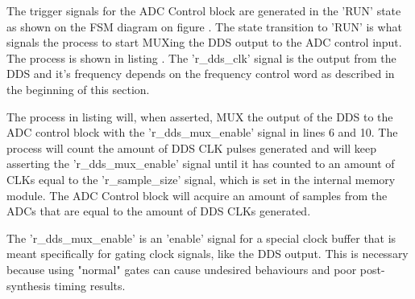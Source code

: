 The trigger signals for the ADC Control block are generated in the 'RUN' state as shown on the FSM diagram on figure . The state transition to 'RUN' is what signals the process to start MUXing the DDS output to the ADC control input. The process is shown in listing . The 'r\_dds\_clk' signal is the output from the DDS and it's frequency depends on the frequency control word as described in the beginning of this section.



The process in listing  will, when asserted, MUX the output of the DDS to the ADC control block with the 'r\_dds\_mux\_enable' signal in lines 6 and 10. The process will count the amount of DDS CLK pulses generated and will keep asserting the 'r\_dds\_mux\_enable' signal until it has counted to an amount of CLKs equal to the 'r\_sample\_size' signal, which is set in the internal memory module. The ADC Control block will acquire an amount of samples from the ADCs that are equal to the amount of DDS CLKs generated.

The 'r\_dds\_mux\_enable' is an 'enable' signal for a special clock buffer \cite{BUGGCEClockBuffer} that is meant specifically for gating clock signals, like the DDS output. This is necessary because using "normal" gates can cause undesired behaviours and poor post-synthesis timing results.

